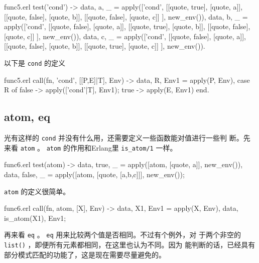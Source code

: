 \documentclass[preview,multi,crop=false,border=1in,class=memoir]{standalone}
\begin{document}
\begin{preview-page}
\begin{SourceCode}[106][124]{func5.erl}
test('cond') ->
    {{data, a}, _} =
        apply(['cond',
               [[quote, true],  [quote, a]],
               [[quote, false], [quote, b]],
               [[quote, false], [quote, c]]
              ], new_env()),
    {{data, b}, _} =
        apply(['cond',
               [[quote, false], [quote, a]],
               [[quote, true],  [quote, b]],
               [[quote, false], [quote, c]]
              ], new_env()),
    {{data, c}, _} =
        apply(['cond',
               [[quote, false], [quote, a]],
               [[quote, false], [quote, b]],
               [[quote, true],  [quote, c]]
              ], new_env()).
\end{SourceCode}

以下是 \verb|cond| 的定义

\begin{SourceCode}[39][46]{func5.erl}
call({fn, 'cond'}, [[P,E]|T], Env) ->
    {{data, R}, Env1} = apply(P, Env),
    case R of
        false ->
            apply(['cond'|T], Env1);
        true ->
            apply(E, Env1)
    end.
\end{SourceCode}

\subsection{atom, eq}

光有这样的 \verb|cond| 并没有什么用，还需要定义一些函数能对值进行一些判
断。先来看 \verb|atom| 。 \verb|atom| 的作用和Erlang里
\verb|is_atom/1| 一样。

\begin{SourceCode}[143][147]{func6.erl}
test(atom) ->
    {{data, true}, _} =
        apply([atom, [quote, a]], new_env()),
    {{data, false}, _} =
        apply([atom, [quote, [a,b,c]]], new_env());
\end{SourceCode}

\verb|atom| 的定义很简单。

\begin{SourceCode}[47][49]{func6.erl}
call({fn, atom}, [X], Env) ->
    {{data, X1}, Env1} = apply(X, Env),
    {{data, is_atom(X1)}, Env1};
\end{SourceCode}

再来看 \verb|eq| 。 \verb|eq| 用来比较两个值是否相同。不过有个例外，对
于两个非空的 \verb|list()| ，即便所有元素都相同，在这里也认为不同。因为
能判断的话，已经具有部分模式匹配的功能了，这是现在需要尽量避免的。


\end{preview-page}
\end{document}
